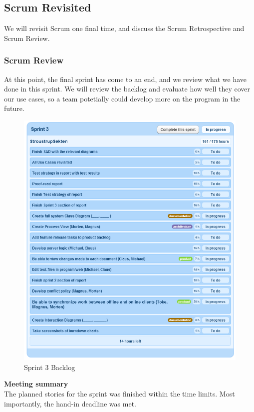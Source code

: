 \subsection{Scrum Revisited}
We will revisit Scrum one final time, and discuss the Scrum Retrospective and Scrum Review.
\subsubsection{Scrum Review}
At this point, the final sprint has come to an end, and we review what we have done in this sprint. We will review the backlog and evaluate how well they cover our use cases, so a team potetially could develop more on the program in the future.  \\
\newline
\begin{figure}[H]
  \includegraphics[width=\textwidth]{illustrations/sprint3backlog.PNG}
  \caption{Sprint 3 Backlog}
  \label{sprint3backlog}
\end{figure}
\textbf{Meeting summary}\\
The planned stories for the sprint was finished within the time limits. Most importantly, the hand-in deadline was met.\\
